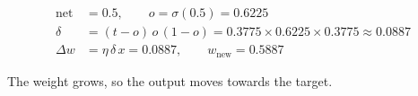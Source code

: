 \begin{formulas}
\begin{align*}
\text{net} &= 0.5, \qquad o = \sigma(0.5) = 0.6225\\
\delta &= (t - o)\,o\,(1 - o) = 0.3775 \times 0.6225 \times 0.3775 \approx 0.0887\\
\Delta w &= \eta\,\delta\,x = 0.0887, \qquad w_{\text{new}} = 0.5887
\end{align*}
\end{formulas}
\noindent The weight grows, so the output moves towards the target.